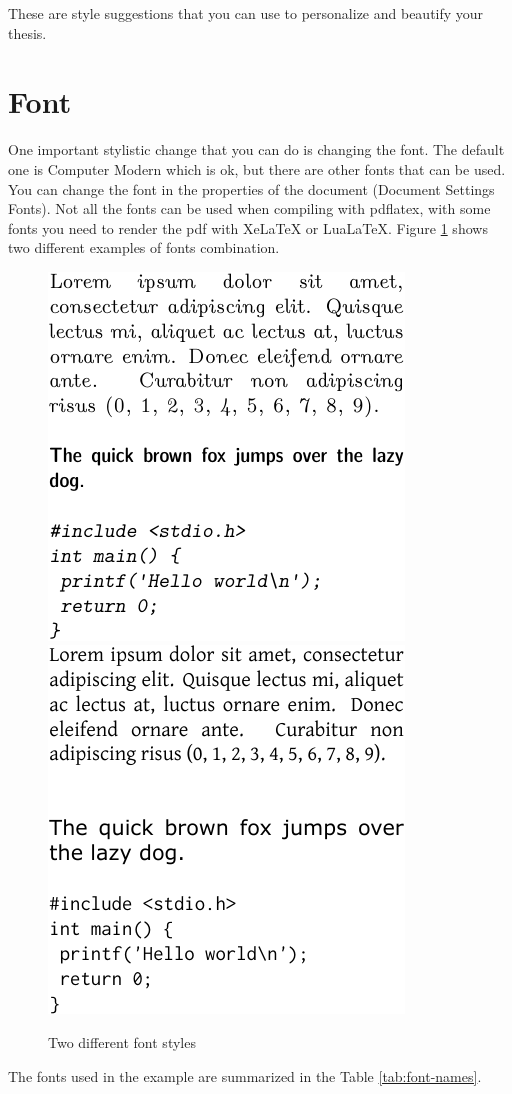These are style suggestions that you can use to personalize and beautify
your thesis.

\section{Font}

One important stylistic change that you can do is changing the font.
The default one is Computer Modern which is ok, but there are other
fonts that can be used. You can change the font in the properties
of the document (\textsf{Document} \textsf{\lyxarrow} \textsf{Settings}
\textsf{\lyxarrow} \textsf{Fonts}). Not all the fonts can be used
when compiling with \textsf{pdflatex}, with some fonts you need to
render the \textsf{pdf} with Xe\LaTeX{} or Lua\LaTeX . Figure \ref{fig:font-styles}
shows two different examples of fonts combination.

\begin{figure}[h]
\includegraphics{chapter-4/images/latin-modern-font}\hfill{}\includegraphics{chapter-4/images/funny-combination-font}

\caption{\label{fig:font-styles}Two different font styles}
\end{figure}
The fonts used in the example are summarized in the Table \ref{tab:font-names}.

